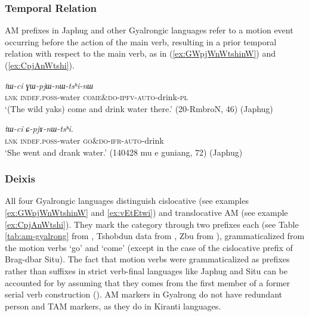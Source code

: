 \documentclass[oneside,a4paper,11pt]{article}
\newcommand{\ipa}[1]{{\phon\textit{#1}}}
\newcommand{\sens}[1]{‘#1’}
\newcommand{\rouge}[1]{{\color{red}#1}}
\begin{document}
 \subsubsection{Temporal Relation}
AM prefixes in Japhug and other Gyalrongic languages refer to a motion event occurring before the action of the main verb, resulting in a prior temporal relation with respect to the main verb, as in  (\ref{ex:GWpjWnWtshinW}) and (\ref{ex:CpjAnWtshi}).

\begin{exe}
\ex \label{ex:GWpjWnWtshinW}
\gll \ipa{tɕe}	\ipa{tɯ-ci}	\ipa{\rouge{ɣɯ}-pjɯ-nɯ-tsʰi-nɯ} \\
\textsc{lnk} \textsc{indef}.\textsc{poss}-water \rouge{\textsc{come\&do}}-\textsc{ipfv}-\textsc{auto}-drink-\textsc{pl} \\
\glt \sens{(The wild yaks) come and drink water there.} (20-RmbroN, 46) (Japhug)
\end{exe}

\begin{exe}
\ex \label{ex:CpjAnWtshi}
\gll \ipa{tɕe}	\ipa{tɯ-ci}	\ipa{\rouge{ɕ}-pjɤ-nɯ-tsʰi}. \\
\textsc{lnk} \textsc{indef}.\textsc{poss}-water \rouge{\textsc{go\&do}}-\textsc{ifr}-\textsc{auto}-drink  \\
\glt \sens{She went and drank water.} (140428 mu e guniang, 72) (Japhug)
\end{exe}

\subsubsection{Deixis}

All four Gyalrongic languages  distinguish cislocative (see examples \ref{ex:GWpjWnWtshinW} and \ref{ex:vEtEtwi}) and translocative AM (see example \ref{ex:CpjAnWtshi}).  They mark the category through two prefixes each (see Table \ref{tab:am-gyalrong} from \citealt[200]{zhang16bragdbar}, Tshobdun data from \citealt{sun12complementation}, Zbu from \citealt{gong18these}), grammaticalized from the motion verbs `go' and `come' (except in the case of the cislocative prefix of Brag-dbar Situ). The fact that motion verbs were grammaticalized as prefixes rather than suffixes in strict verb-final languages like Japhug and Situ can be accounted for by assuming that they comes from the first member of a former serial verb construction (\citealt{jacques13harmonization}). AM markers in Gyalrong do not have redundant person and TAM markers, as they do in Kiranti languages. 
\end{document}

